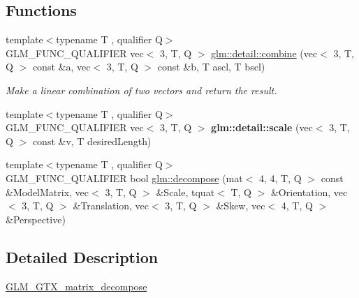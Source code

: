 \subsection*{Functions}
\begin{DoxyCompactItemize}
\item 
\mbox{\label{matrix__decompose_8inl_a62c6df7a0862562560f4ff00b215f4e6}} 
{\footnotesize template$<$typename T , qualifier Q$>$ }\\G\+L\+M\+\_\+\+F\+U\+N\+C\+\_\+\+Q\+U\+A\+L\+I\+F\+I\+ER vec$<$ 3, T, Q $>$ \hyperlink{matrix__decompose_8inl_a62c6df7a0862562560f4ff00b215f4e6}{glm\+::detail\+::combine} (vec$<$ 3, T, Q $>$ const \&a, vec$<$ 3, T, Q $>$ const \&b, T ascl, T bscl)
\begin{DoxyCompactList}\small\item\em Make a linear combination of two vectors and return the result. \end{DoxyCompactList}\item 
\mbox{\label{matrix__decompose_8inl_ab5e74c51452215027ae64d0ef1731f9c}} 
{\footnotesize template$<$typename T , qualifier Q$>$ }\\G\+L\+M\+\_\+\+F\+U\+N\+C\+\_\+\+Q\+U\+A\+L\+I\+F\+I\+ER vec$<$ 3, T, Q $>$ {\bfseries glm\+::detail\+::scale} (vec$<$ 3, T, Q $>$ const \&v, T desired\+Length)
\item 
{\footnotesize template$<$typename T , qualifier Q$>$ }\\G\+L\+M\+\_\+\+F\+U\+N\+C\+\_\+\+Q\+U\+A\+L\+I\+F\+I\+ER bool \hyperlink{group__gtx__matrix__decompose_ga91185463739c855d602596907a9994bc}{glm\+::decompose} (mat$<$ 4, 4, T, Q $>$ const \&Model\+Matrix, vec$<$ 3, T, Q $>$ \&Scale, tquat$<$ T, Q $>$ \&Orientation, vec$<$ 3, T, Q $>$ \&Translation, vec$<$ 3, T, Q $>$ \&Skew, vec$<$ 4, T, Q $>$ \&Perspective)
\end{DoxyCompactItemize}


\subsection{Detailed Description}
\hyperlink{group__gtx__matrix__decompose}{G\+L\+M\+\_\+\+G\+T\+X\+\_\+matrix\+\_\+decompose} 